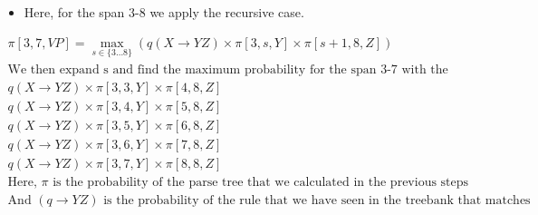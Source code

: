 \documentclass[11pt]{article}
\begin{document}
\begin{minipage}[l]{.5\linewidth}
    \begin{figure}[H]
        \centering
    \end{figure}    
\end{minipage}\hfill
\begin{minipage}[r]{.48\linewidth}
    \begin{itemize}
        \item Here, for the span 3-8 we apply the recursive case.
    \end{itemize}
\end{minipage}

\begin{gather*}
    \pi[3,7,VP] = \max_{s\in \{3\dots8\}}(q(X\rightarrow YZ) \times \pi[3,s,Y] \times \pi[s+1,8,Z]) \\
    \text{We then expand s and find the maximum probability for the span 3-7 with the head VP} \\
    q(X\rightarrow YZ) \times \pi[3,3,Y] \times \pi[4,8,Z] \\
    q(X\rightarrow YZ) \times \pi[3,4,Y] \times \pi[5,8,Z] \\
    q(X\rightarrow YZ) \times \pi[3,5,Y] \times \pi[6,8,Z] \\
    q(X\rightarrow YZ) \times \pi[3,6,Y] \times \pi[7,8,Z] \\
    q(X\rightarrow YZ) \times \pi[3,7,Y] \times \pi[8,8,Z] \\
    \text{Here, $\pi$ is the probability of the parse tree that we calculated in the previous steps} \\
    \text{And $(q\rightarrow YZ)$ is the probability of the rule that we have seen in the treebank that matches the given substring} \\ 
\end{gather*}
\end{document}
